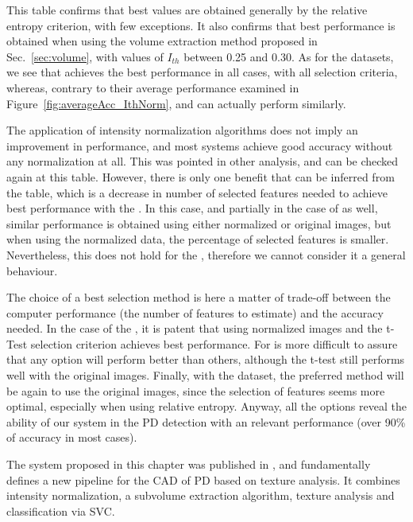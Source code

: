 This table confirms that best values are obtained generally by the relative entropy criterion, with few exceptions. It also confirms that best performance is obtained when using the volume extraction method proposed in Sec.~\ref{sec:volume}, with values of $I_{th}$ between 0.25 and 0.30. As for the datasets, we see that \ppmidat{} achieves the best performance in all cases, with all selection criteria, whereas, contrary to their average performance examined in Figure~\ref{fig:averageAcc_IthNorm}, \vdlvdat{}{} and \vdlvdat{} can actually perform similarly. 

The application of intensity normalization algorithms does not imply an improvement in performance, and most systems achieve good accuracy without any normalization at all. This was pointed in other analysis, and can be checked again at this table. However, there is only one benefit that can be inferred from the table, which is a decrease in number of selected features needed to achieve best performance with the \ppmidat{}. In this case, and partially in the case of \vdlvdat{}{} as well, similar performance is obtained using either normalized or original images, but when using the normalized data, the percentage of selected features is smaller. Nevertheless, this does not hold for the \vdlvdat{}, therefore we cannot consider it a general behaviour. 

The choice of a best selection method is here a matter of trade-off between the computer performance (the number of features to estimate) and the accuracy needed. In the case of the \ppmidat{}, it is patent that using normalized images and the t-Test selection criterion achieves best performance. For \vdlvdat{}{} is more difficult to assure that any option will perform better than others, although the t-test still performs well with the original images. Finally, with the \vdlvdat{} dataset, the preferred method will be again to use the original images, since the selection of features seems more optimal, especially when using relative entropy. Anyway, all the options reveal the ability of our system in the PD detection with an relevant performance (over 90\% of accuracy in most cases). 

\label{sec:ch5discuss}
The system proposed in this chapter was published in \cite{Martinez-Murcia2013266,martinez2014parametrization}, and fundamentally defines a new pipeline for the \ac{CAD} of \ac{PD} based on texture analysis. It combines intensity normalization, a subvolume extraction algorithm, texture analysis and classification via \ac{SVC}. 

